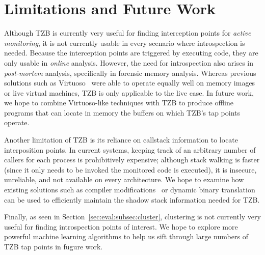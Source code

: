 \section{Limitations and Future Work}
\label{sec:limitations}

Although TZB is currently very useful for finding interception points
for \emph{active monitoring}, it is not currently usable in every
scenario where introspection is needed. Because the interception points
are triggered by executing code, they are only usable in \emph{online}
analysis. However, the need for introspection also arises in
\emph{post-mortem} analysis, specifically in forensic memory analysis.
Whereas previous solutions such as Virtuoso~\cite{Dolan-Gavitt:2011uq}
were able to operate equally well on memory images or live virtual
machines, TZB is only applicable to the live case. In future work, we
hope to combine Virtuoso-like techniques with TZB to produce offline
programs that can locate in memory the buffers on which TZB's tap points
operate.

Another limitation of TZB is its reliance on callstack information to
locate interposition points. In current systems, keeping track of an
arbitrary number of callers for each process is prohibitively expensive;
although stack walking is faster (since it only needs to be invoked the
monitored code is executed), it is insecure, unreliable, and not
available on every architecture. We hope to examine how existing
solutions such as compiler modifications~\cite{stackshield,Chiueh:2001ys}
or dynamic binary translation~\cite{Sinnadurai:2008vn} can be used to
efficiently maintain the shadow stack information needed for TZB.

Finally, as seen in Section~\ref{sec:eval:subsec:cluster}, clustering is
not currently very useful for finding introspection points of interest.
We hope to explore more powerful machine learning algorithms to help us
sift through large numbers of TZB tap points in fugure work.
